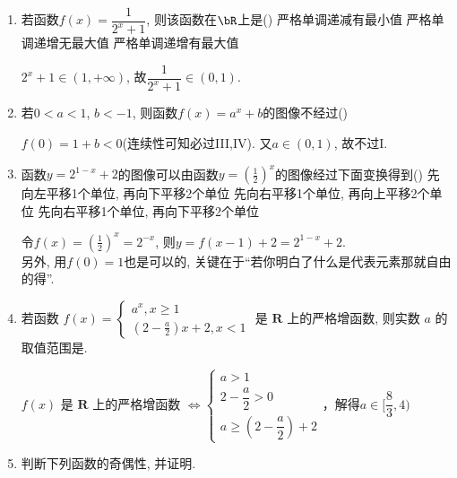 \begin{enumerate}
\item 若函数$f(x)=\dfrac{1}{2^x+1}$, 则该函数在$\bR$上是\dotfill()
{严格单调递减有最小值}
{严格单调递增无最大值}
{严格单调递增有最大值}
\begin{jieda}
$2^x+1\in(1,+\infty)$, 故$\dfrac{1}{2^x+1}\in(0,1)$. 
\end{jieda}


\item 若$0<a<1$, $b<-1$, 则函数$f(x)=a^x+b$的图像不经过\dotfill()
\begin{jieda}
$f(0)=1+b<0$(连续性可知必过III,IV). 又$a\in(0,1)$, 故不过I. 
\end{jieda}


\item 函数$y=2^{1-x}+2$的图像可以由函数$y=(\frac{1}{2})^x$的图像经过下面变换得到\dotfill()
{先向左平移1个单位, 再向下平移2个单位}
{先向右平移1个单位, 再向上平移2个单位}
{先向右平移1个单位, 再向下平移2个单位}
\begin{jieda}
令$f(x)=(\frac{1}{2})^x=2^{-x}$, 则$y=f(x-1)+2=2^{1-x}+2$. \\
另外, 用$f(0)=1$也是可以的, 关键在于``若你明白了什么是代表元素那就自由的得''. 
\end{jieda}


\item 若函数 $f(x)=\left\{\begin{array}{l}a^x, x \geq 1 \\ \left(2-\frac{a}{2}\right) x+2, x<1\end{array}\right.$ 是 $\mathbf{R}$ 上的严格增函数, 则实数 $a$ 的取值范围是\blkda{$[\frac{8}{3}, 4)$}.
\begin{jieda}
    $f(x)$ 是 $\mathbf{R}$ 上的严格增函数 $\Longleftrightarrow \left \{ \begin{array}{l}
        a > 1  \\
        2 - \dfrac{a}{2} > 0 \\
        a \geq  (2-\dfrac{a}{2}) + 2
    \end{array}\right.$，解得$a \in [\dfrac{8}{3}, 4)$
\end{jieda}


\item 判断下列函数的奇偶性, 并证明. \\
\begin{jieda}
\end{jieda}


\end{enumerate}
